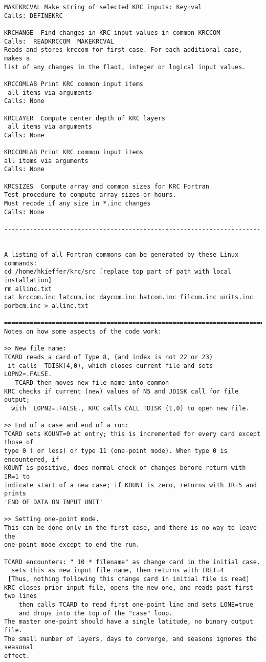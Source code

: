 \begin{verbatim}
MAKEKRCVAL Make string of selected KRC inputs: Key=val
Calls: DEFINEKRC

KRCHANGE  Find changes in KRC input values in common KRCCOM
Calls:  READKRCCOM  MAKEKRCVAL
Reads and stores krccom for first case. For each additional case, makes a 
list of any changes in the flaot, integer or logical input values. 

KRCCOMLAB Print KRC common input items
 all items via arguments
Calls: None

KRCLAYER  Compute center depth of KRC layers
 all items via arguments
Calls: None

KRCCOMLAB Print KRC common input items
all items via arguments
Calls: None

KRCSIZES  Compute array and common sizes for KRC Fortran
Test procedure to compute array sizes or hours.
Must recode if any size in *.inc changes
Calls: None

--------------------------------------------------------------------------------

A listing of all Fortran commons can be generated by these Linux commands:
cd /home/hkieffer/krc/src [replace top part of path with local installation]
rm allinc.txt
cat krccom.inc latcom.inc daycom.inc hatcom.inc filcom.inc units.inc porbcm.inc > allinc.txt 

==============================================================================
Notes on how some aspects of the code work:

>> New file name: 
TCARD reads a card of Type 8, (and index is not 22 or 23)
 it calls  TDISK(4,0), which closes current file and sets  LOPN2=.FALSE.
   TCARD then moves new file name into common 
KRC checks if current (new) values of N5 and JDISK call for file output;
  with  LOPN2=.FALSE., KRC calls CALL TDISK (1,0) to open new file.

>> End of a case and end of a run:
TCARD sets KOUNT=0 at entry; this is incremented for every card except those of
type 0 ( or less) or type 11 (one-point mode). When type 0 is encountered, if
KOUNT is positive, does normal check of changes before return with IR=1 to
indicate start of a new case; if KOUNT is zero, returns with IR=5 and prints
'END OF DATA ON INPUT UNIT'

>> Setting one-point mode.
This can be done only in the first case, and there is no way to leave the 
one-point mode except to end the run.

TCARD encounters: " 10 * filename" as change card in the initial case.
  sets this as new input file name, then returns with IRET=4 
 [Thus, nothing following this change card in initial file is read]
KRC closes prior input file, opens the new one, and reads past first two lines 
    then calls TCARD to read first one-point line and sets LONE=true
    and drops into the top of the "case" loop. 
The master one-point should have a single latitude, no binary output file.
The small number of layers, days to converge, and seasons ignores the seasonal 
effect.


\end{verbatim}

